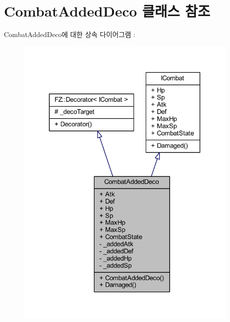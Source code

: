 \hypertarget{class_combat_added_deco}{}\section{Combat\+Added\+Deco 클래스 참조}
\label{class_combat_added_deco}


Combat\+Added\+Deco에 대한 상속 다이어그램 \+: 
\nopagebreak
\begin{figure}[H]
\begin{center}
\leavevmode
\includegraphics[width=312pt]{class_combat_added_deco__inherit__graph}
\end{center}
\end{figure}


